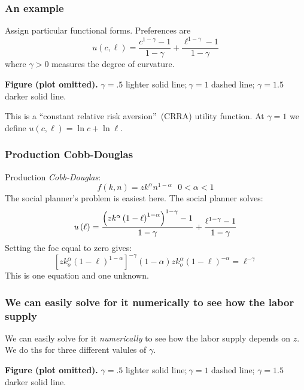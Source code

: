 \documentclass[aspectratio=169]{ltx-talk}
\begin{document}
\begin{frame}
\frametitle{An example}
Assign particular functional forms. Preferences are 
\begin{equation*}
u\left( c,\ell \right) =\frac{c^{1-\gamma }-1}{1-\gamma }+\frac{\ell
^{1-\gamma }-1}{1-\gamma }
\end{equation*}%
where $\gamma >0$ measures the degree of curvature.
\par\noindent\textbf{Figure (plot omitted).} $\gamma =.5$ lighter solid line;$\ \gamma =1$
dashed line; $\gamma =1.5$ darker solid line.\par


This is a \textquotedblleft constant relative risk
aversion\textquotedblright\ (CRRA) utility function. At $\gamma =1$ we
define $u\left( c,\ell \right) =\ln c+\ln \ell .$
\par{}
\end{frame}

\begin{frame}
\frametitle{Production Cobb-Douglas}
Production \textit{Cobb-Douglas}:%
\begin{equation*}
f\left( k,n\right) =zk^{\alpha }n^{1-\alpha }\text{ }0<\alpha <1
\end{equation*}%
The social planner's problem is easiest here. The social planner solves:%
\begin{equation*}
u\left( \ell \right) =\frac{\left( zk^{\alpha }\left( 1-\ell \right)
^{1-\alpha }\right) ^{1-\gamma }-1}{1-\gamma }+\frac{\ell ^{1-\gamma }-1}{%
1-\gamma }
\end{equation*}%
Setting the foc equal to zero gives:%
\begin{equation*}
\left[ zk_{o}^{\alpha }\left( 1-\ell \right) ^{1-\alpha }\right] ^{-\gamma
}\left( 1-\alpha \right) zk_{o}^{\alpha }\left( 1-\ell \right) ^{-\alpha
}=\ell ^{-\gamma }
\end{equation*}%
This is one equation and one unknown.
\end{frame}

\begin{frame}
\frametitle{We can easily solve for it numerically to see how the labor supply}
We can easily solve for it \textit{numerically} to see how the labor supply
depends on $z$. We do ths for three different valules of $\gamma .$


\par\noindent\textbf{Figure (plot omitted).} $\gamma =.5$ lighter solid
line;$\ \gamma =1$ dashed line; $\gamma =1.5$ darker solid
line.\par
\end{frame}
\end{document}
